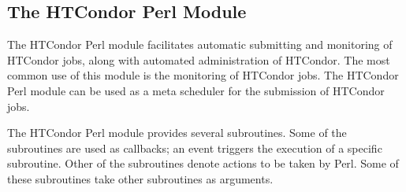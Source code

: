 \subsection{\label{sec:condor-pm} The HTCondor Perl Module}

The HTCondor Perl module facilitates automatic submitting and monitoring of
HTCondor jobs, along with automated administration of HTCondor.
The most common
use of this module is the monitoring of HTCondor jobs.
The HTCondor Perl module can be used as a meta scheduler for the submission
of HTCondor jobs.

The HTCondor Perl module provides several subroutines.
Some of the subroutines are used as callbacks;
an event triggers the execution of a specific subroutine.
Other of the subroutines denote actions to be taken by Perl.
Some of these subroutines take other subroutines as arguments.

